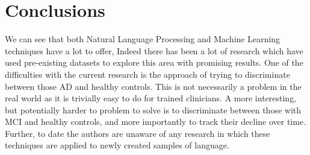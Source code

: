 \documentclass[12pt]{article}
\begin{document}
\section{Conclusions}\label{conclusions}
We can see that both Natural Language Processing and Machine Learning techniques have a lot to offer, Indeed there has been a lot of research which have used pre-existing datasets to explore this area with promising results. One of the difficulties with the current research is the approach of trying to discriminate between those AD and healthy controls. This is not necessarily a problem in the real world as it is trivially easy to do for trained clinicians. A more interesting, but potentially harder to problem to solve is to discriminate between those with MCI and healthy controls, and more importantly to track their decline over time. Further, to date the authors are unaware of any research in which these techniques are applied to newly created samples of language. 





\appendix
\end{document}
